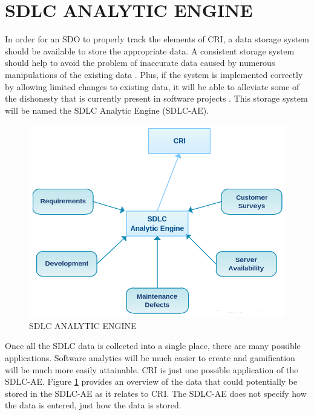\documentclass[SDSUThesis.tex]{subfiles}
\begin{document}
\section{SDLC ANALYTIC ENGINE}
\label{sec:SDLC-AE}

    In order for an SDO to properly track the elements of CRI, a data storage 
    system should be available to store the appropriate data.  A consistent 
    storage system should help to avoid the problem of inaccurate
    data caused by numerous manipulations of the existing data 
    \cite{Olson2003}. Plus, if the system
    is implemented correctly by allowing limited changes to existing data, 
    it will be able to alleviate
    some of the dishonesty that is currently present in software projects 
    \cite{Rost2011}. This storage system will be named the SDLC Analytic 
    Engine (SDLC-AE). 
    
    \begin{figure}[hbt]
        \includegraphics[scale=.75]{images/sdlcae.png}
        \caption{SDLC ANALYTIC ENGINE}
        \label{fig:sdlc-ae}
    \end{figure}
    
    
    Once all the SDLC data is collected into a single place, there are 
    many possible applications.  Software analytics
    will be much easier to create and gamification will be much more easily attainable.  
    CRI is just one possible application of the SDLC-AE.  Figure \ref{fig:sdlc-ae} 
    provides an overview of 
    the data that could potentially be stored in the SDLC-AE as it relates to CRI. The
    SDLC-AE does not specify how the data is entered, just how the data is stored.
    
\end{document}
